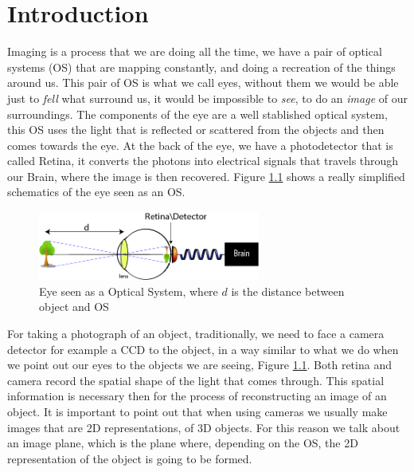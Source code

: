
\chapter{Introduction} %

\label{Chapter1} %

Imaging is a process that we are doing all the time, we have a pair of optical systems (OS) that are mapping
constantly, and doing a recreation of the things around us. This pair of OS is what we call eyes, 
without them we would be able just to \textit{fell} what surround us, it would be impossible to \textit{see}, to do an
\textit{image} of our surroundings. The components of the eye are a well stablished optical system, this OS 
uses the light that is reflected or scattered from the objects and then comes towards the eye. At the
back of the eye, we have a photodetector that is called Retina, it converts the photons into electrical
signals that travels through our Brain, where the image is then recovered. Figure \ref{fig:eye} shows a really 
simplified schematics of the eye seen as an OS.

\begin{figure}[h!]
\centering
 \includegraphics[width=0.65\textwidth]{Figures/eye.png}
 \caption{Eye seen as a Optical System, where $d$ is the distance between object and OS} 
\label{fig:eye}
\end{figure}


For taking a photograph of an object, traditionally, we need to face a camera detector for example a CCD to the object, 
in a way similar to what we do when we point out our eyes to the objects we are seeing, Figure \ref{fig:eye}.
Both retina and camera record the spatial shape of the light that comes through.
This spatial information is necessary then for the process of reconstructing an image of an object. 
It is important to point out that when using cameras we usually make images that are 2D representations, of 3D objects. For this
reason we talk about an image plane, which is the plane where, depending on the OS, the 2D representation
of the object is going to be formed. 


